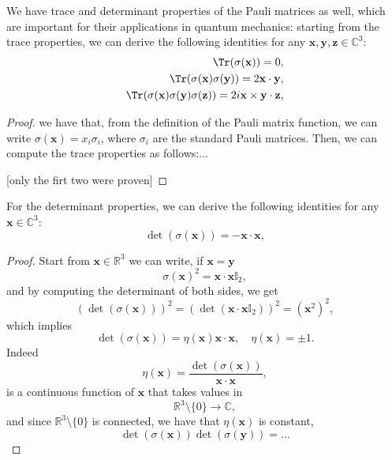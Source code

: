 We have trace and determinant properties of the Pauli matrices as well, which are important for their applications in quantum mechanics: starting from the trace properties, we can derive the following identities for any \(\mathbf{x}, \mathbf{y}, \mathbf{z} \in \mathbb{C}^3\):
\[
    \begin{aligned}
        \Tr (\sigma(\mathbf{x})) = 0,                                              \\
        \Tr(\sigma(\mathbf{x})\sigma(\mathbf{y})) = 2 \mathbf{x} \cdot \mathbf{y}, \\
        \Tr(\sigma(\mathbf{x})\sigma(\mathbf{y})\sigma(\mathbf{z})) = 2i \mathbf{x} \times \mathbf{y} \cdot \mathbf{z},
    \end{aligned}
\]
\begin{proof}
    we have that, from the definition of the Pauli matrix function, we can write \(\sigma(\mathbf{x}) = x_i \sigma_i\), where \(\sigma_i\) are the standard Pauli matrices. Then, we can compute the trace properties as follows:...

    [only the firt two were proven]
\end{proof}

For the determinant properties, we can derive the following identities for any \(\mathbf{x} \in \mathbb{C}^3\):
\[
    \det(\sigma(\mathbf{x})) = -\mathbf{x} \cdot \mathbf{x},
\]

\begin{proof}
    Start from \(\mathbf{x} \in \mathbb{R}^3\) we can write, if \(\mathbf{x} = \mathbf{y}\)
    \[
        \sigma(\mathbf{x})^2 = \mathbf{x} \cdot \mathbf{x} \mathbb{I}_2,
    \]
    and by computing the determinant of both sides, we get
    \[
        (\det(\sigma(\mathbf{x})))^2 = (\det(\mathbf{x} \cdot \mathbf{x} \mathbb{I}_2))^2 = (\mathbf{x}^2)^2,
    \]
    which implies
    \[
        \det(\sigma(\mathbf{x})) = \eta(\mathbf{x}) \mathbf{x} \cdot \mathbf{x}, \quad \eta(\mathbf{x}) = \pm 1.
    \]
    Indeed
    \[
        \eta(\mathbf{x}) = \frac{\det(\sigma(\mathbf{x}))}{\mathbf{x} \cdot \mathbf{x}},
    \]
    is a continuous function of \(\mathbf{x}\) that takes values in
    \[
        \mathbb{R}^3 \setminus \{0\} \to \mathbb{C},
    \]
    and since \(\mathbb{R}^3 \setminus \{0\}\) is connected, we have that \(\eta(\mathbf{x})\) is constant,
    \[
        \det(\sigma(\mathbf{x})) \det(\sigma(\mathbf{y})) = \dots
    \]
\end{proof}